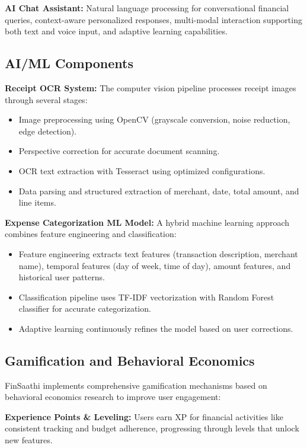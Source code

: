 \documentclass[10pt,twocolumn,twoside,a4paper]{article}
\begin{document}
\textbf{AI Chat Assistant:} Natural language processing for conversational financial queries, context-aware personalized responses, multi-modal interaction supporting both text and voice input, and adaptive learning capabilities.

\subsection{AI/ML Components}
\textbf{Receipt OCR System:} The computer vision pipeline processes receipt images through several stages:
\begin{itemize}[leftmargin=*]
  \item Image preprocessing using OpenCV (grayscale conversion, noise reduction, edge detection).
  \item Perspective correction for accurate document scanning.
  \item OCR text extraction with Tesseract using optimized configurations.
  \item Data parsing and structured extraction of merchant, date, total amount, and line items.
\end{itemize}

\textbf{Expense Categorization ML Model:} A hybrid machine learning approach combines feature engineering and classification:
\begin{itemize}[leftmargin=*]
  \item Feature engineering extracts text features (transaction description, merchant name), temporal features (day of week, time of day), amount features, and historical user patterns.
  \item Classification pipeline uses TF-IDF vectorization with Random Forest classifier for accurate categorization.
  \item Adaptive learning continuously refines the model based on user corrections.
\end{itemize}

\subsection{Gamification and Behavioral Economics}
FinSaathi implements comprehensive gamification mechanisms based on behavioral economics research to improve user engagement:

\textbf{Experience Points \& Leveling:} Users earn XP for financial activities like consistent tracking and budget adherence, progressing through levels that unlock new features.
\end{document}
